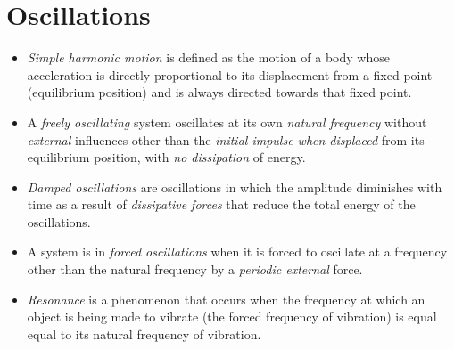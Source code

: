 \documentclass[oneside]{book}
\begin{document}
\chapter{Oscillations}
\begin{itemize}
    \item \textit{Simple harmonic motion} is defined as the motion of a body whose acceleration is directly proportional to its displacement from a fixed point (equilibrium position) and is always directed towards that fixed point.
    \item A \textit{freely oscillating} system oscillates at its own \textit{natural frequency} without \emph{external} influences other than the \emph{initial impulse when displaced} from its equilibrium position, with \emph{no dissipation} of energy.
    \item \textit{Damped oscillations} are oscillations in which the amplitude diminishes with time as a result of \emph{dissipative forces} that reduce the total energy of the oscillations.
    \item A system is in \textit{forced oscillations} when it is forced to oscillate at a frequency other than the natural frequency by a \emph{periodic external} force.
    \item \textit{Resonance} is a phenomenon that occurs when the frequency at which an object is being made to vibrate (the forced frequency of vibration) is equal equal to its natural frequency of vibration.
\end{itemize}
\end{document}
